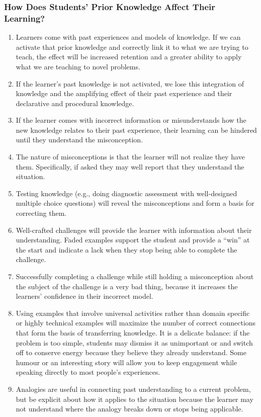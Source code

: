 \subsubsection{How Does Students' Prior Knowledge Affect Their
Learning?}\label{how-does-students-prior-knowledge-affect-their-learning}

\begin{enumerate}
\def\labelenumi{\arabic{enumi}.}
\itemsep1pt\parskip0pt
\item
  Learners come with past experiences and models of knowledge. If we can
  activate that prior knowledge and correctly link it to what we are
  trying to teach, the effect will be increased retention and a greater
  ability to apply what we are teaching to novel problems.
\item
  If the learner's past knowledge is not activated, we lose this
  integration of knowledge and the amplifying effect of their past
  experience and their declarative and procedural knowledge.
\item
  If the learner comes with incorrect information or misunderstands how
  the new knowledge relates to their past experience, their learning can
  be hindered until they understand the misconception.
\item
  The nature of misconceptions is that the learner will not realize they
  have them. Specifically, if asked they may well report that they
  understand the situation.
\item
  Testing knowledge (e.g., doing diagnostic assessment with
  well-designed multiple choice questions) will reveal the
  misconceptions and form a basis for correcting them.
\item
  Well-crafted challenges will provide the learner with information
  about their understanding. Faded examples support the student and
  provide a ``win'' at the start and indicate a lack when they stop
  being able to complete the challenge.
\item
  Successfully completing a challenge while still holding a
  misconception about the subject of the challenge is a very bad thing,
  because it increases the learners' confidence in their incorrect
  model.
\item
  Using examples that involve universal activities rather than domain
  specific or highly technical examples will maximize the number of
  correct connections that form the basis of transferring knowledge. It
  is a delicate balance: if the problem is too simple, students may
  dismiss it as unimportant or and switch off to conserve energy because
  they believe they already understand. Some humour or an interesting
  story will allow you to keep engagement while speaking directly to
  most people's experiences.
\item
  Analogies are useful in connecting past understanding to a current
  problem, but be explicit about how it applies to the situation because
  the learner may not understand where the analogy breaks down or stops
  being applicable.
\end{enumerate}

